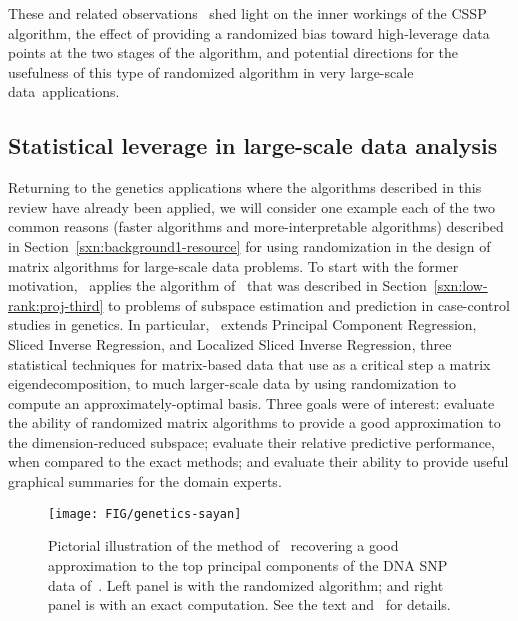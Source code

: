 \documentclass[twoside]{article}
\begin{document}
These and related observations~\cite{BMD08_CSSP_KDD,BMD08_CSSP_TRv2} shed 
light on the inner workings of the CSSP algorithm, the effect of providing a 
randomized bias toward high-leverage data points at the two stages of the 
algorithm, and potential directions for the usefulness of this type of 
randomized algorithm in very large-scale data~applications.




\subsection{Statistical leverage in large-scale data analysis}
\label{sxn:empirical-forward}

Returning to the genetics applications where the algorithms described in 
this review have already been applied, we will consider one example each of 
the two common reasons (faster algorithms and more-interpretable algorithms) 
described in Section~\ref{sxn:background1-resource} for using randomization 
in the design of matrix algorithms for large-scale data problems.
To start with the former motivation,~\cite{Sayan11-unpub} applies the 
algorithm of~\cite{RST09} that was described in 
Section~\ref{sxn:low-rank:proj-third} to problems of subspace estimation and 
prediction in case-control studies in genetics.
In particular,~\cite{Sayan11-unpub} extends Principal Component Regression, 
Sliced Inverse Regression, and Localized Sliced Inverse Regression, three 
statistical techniques for matrix-based data that use as a critical step a 
matrix eigendecomposition, to much larger-scale data by using randomization 
to compute an approximately-optimal basis. 
Three goals were of interest:
evaluate the ability of randomized matrix algorithms to provide a good 
approximation to the dimension-reduced subspace; 
evaluate their relative predictive performance, when compared to the exact 
methods; and 
evaluate their ability to provide useful graphical summaries for the domain 
experts.

\begin{figure}
   \begin{center}
         \texttt{[image: FIG/genetics-sayan]}
\end{center}
\caption{Pictorial illustration of the method of~\cite{Sayan11-unpub} 
recovering a good approximation to the top principal components of the 
DNA SNP data of~\cite{Nov08}.  Left panel is with the randomized algorithm; 
and right panel is with an exact computation.  See the text 
and~\cite{Sayan11-unpub} for details.
}
\label{fig:genetics-fast}
\end{figure}
\end{document}
